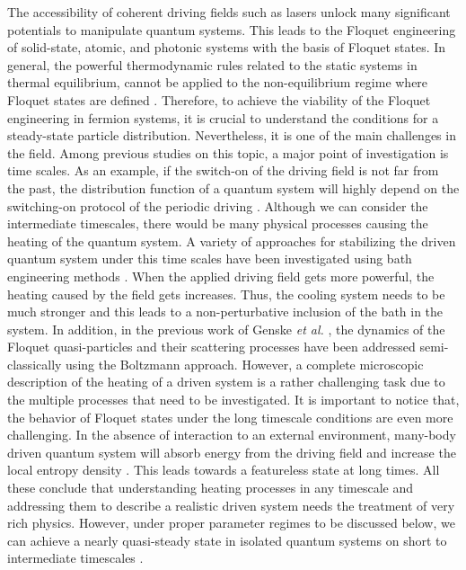 \documentclass{article}
\begin{document}
The accessibility of coherent driving fields such as lasers unlock many significant potentials to manipulate quantum systems. This leads to the Floquet engineering of solid-state, atomic, and photonic systems with the basis of Floquet states. In general, the powerful thermodynamic rules related to the static systems in thermal equilibrium, cannot be applied to the non-equilibrium regime where Floquet states are defined \cite{seetharam2015}. Therefore, to achieve the viability of the Floquet engineering in fermion systems, it is crucial to understand the conditions for a steady-state particle distribution. Nevertheless, it is one of the main challenges in the field. Among previous studies on this topic, a major point of investigation is time scales. As an example, if the switch-on of the driving field is not far from the past, the distribution function of a quantum system will highly depend on the switching-on protocol of the periodic driving \cite{dehghani2014}. Although we can consider the intermediate timescales, there would be many physical processes causing the heating of the quantum system. A variety of approaches for stabilizing the driven quantum system under this time scales have been investigated using bath engineering methods \cite{seetharam2015,weidinger2017,seetharam2019,rudner2020}. When the applied driving field gets more powerful, the heating caused by the field gets increases. Thus, the cooling system needs to be much stronger and this leads to a non-perturbative inclusion of the bath in the system. In addition, in the previous work of Genske \textit{et al.} \cite{genske2015}, the dynamics of the Floquet quasi-particles and their scattering processes have been addressed semi-classically using the Boltzmann approach.
However, a complete microscopic description of the heating of a driven system is a rather challenging task due to the multiple processes that need to be investigated.
It is important to notice that, the behavior of Floquet states under the long timescale conditions are even more challenging. In the absence of interaction to an external environment, many-body driven quantum system will absorb energy from the driving field and increase the local entropy density \cite{rudner2020}. This leads towards a featureless state at long times. All these conclude that understanding heating processes in any timescale and addressing them to describe a realistic driven system needs the treatment of very rich physics. However, under proper parameter regimes to be discussed below, we can achieve a nearly quasi-steady state in isolated quantum systems on short to intermediate timescales \cite{lindner2017,bukov2015,eckardt2015,kuwahara2016,abanin2017,mori2018,rudner2020}.
\end{document}
